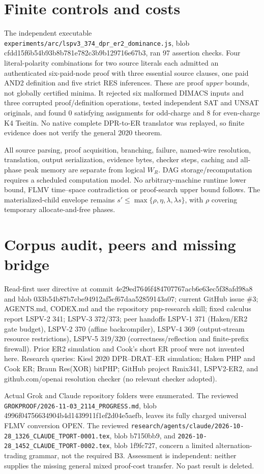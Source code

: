 \documentclass[11pt]{article}
\begin{document}
\section*{Finite controls and costs}
The independent executable \texttt{experiments/arc/lspv3\_374\_dpr\_er2\_dominance.js}, blob cfdd15f6b54b93b8b781e782c3b9b129716e67b3, ran 97 assertion checks. Four literal-polarity combinations for two source literals each admitted an authenticated six-paid-node proof with three essential source clauses, one paid AND2 definition and five strict RES inferences. These are proof \emph{upper} bounds, not globally certified minima. It rejected six malformed DIMACS inputs and three corrupted proof/definition operations, tested independent SAT and UNSAT originals, and found 0 satisfying assignments for odd-charge and 8 for even-charge K4 Tseitin. No native complete DPR-to-ER translator was replayed, so finite evidence does not verify the general 2020 theorem.

All source parsing, proof acquisition, branching, failure, named-wire resolution, translation, output serialization, evidence bytes, checker steps, caching and all-phase peak memory are separate from logical \(W_R\). DAG storage/recomputation requires a scheduled computation model. No arbitrary-machine runtime lower bound, FLMV time--space contradiction or proof-search upper bound follows. The materialized-child envelope remains \(s'\le\max\{\rho,\eta,\lambda,\lambda s\}\), with \(\rho\) covering temporary allocate-and-free phases.

\section*{Corpus audit, peers and missing bridge}
Read-first user directive at commit 4e29ed7646f484707767acb6e63ec5f38afd98a8 and blob 033b54b87b7cbe94912af5cf67daa52859143a07; current GitHub issue \#3; AGENTS.md, CODEX.md and the repository pnp-research skill; fixed calculus report LSPV-2 341; LSPV-3 372/373; peer handoffs LSPV-1 371 (Haken/ER2 gate budget), LSPV-2 370 (affine backcompiler), LSPV-4 369 (output-stream resource restrictions), LSPV-5 319/320 (correctness/reflection and finite-prefix firewall). Prior ER2 simulation and Cook's short ER proof were not invented here. Research queries: Kiesl 2020 DPR--DRAT--ER simulation; Haken PHP and Cook ER; Braun Res(XOR) bitPHP; GitHub project Rmix341, LSPV2-ER2, and github.com/openai resolution checker (no relevant checker adopted).

Actual Grok and Claude repository folders were enumerated. The reviewed \texttt{GROKPROOF/2026-11-03\_2114\_PROGRESS.md}, blob 4996f04756634904b4d1439911f1ef2d04e5aefb, leaves its fully charged universal FLMV conversion OPEN. The reviewed \texttt{research/agents/claude/2026-10-28\_1326\_CLAUDE\_TPORT-0001.tex}, blob b7150bb9, and \texttt{2026-10-28\_1452\_CLAUDE\_TPORT-0002.tex}, blob 1f9fc727, concern a limited alternation-trading grammar, not the required B3. Assessment is independent: neither supplies the missing general mixed proof-cost transfer. No past result is deleted.
\end{document}
